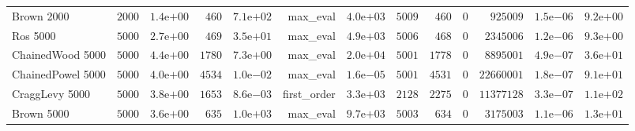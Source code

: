 \begin{longtable}[c]{lrrrrrrrrrrrr}
Brown 2000 & \( 2000\) & \( 1.4\)e\(+00\) & \(  460\) & \( 7.1\)e\(+02\) & max\_eval & \( 4.0\)e\(+03\) & \( 5009\) & \(  460\) & \(    0\) & \(925009\) & \( 1.5\)e\(-06\) & \( 9.2\)e\(+00\) \\
Ros 5000 & \( 5000\) & \( 2.7\)e\(+00\) & \(  469\) & \( 3.5\)e\(+01\) & max\_eval & \( 4.9\)e\(+03\) & \( 5006\) & \(  468\) & \(    0\) & \(2345006\) & \( 1.2\)e\(-06\) & \( 9.3\)e\(+00\) \\
ChainedWood 5000 & \( 5000\) & \( 4.4\)e\(+00\) & \( 1780\) & \( 7.3\)e\(+00\) & max\_eval & \( 2.0\)e\(+04\) & \( 5001\) & \( 1778\) & \(    0\) & \(8895001\) & \( 4.9\)e\(-07\) & \( 3.6\)e\(+01\) \\
ChainedPowel 5000 & \( 5000\) & \( 4.0\)e\(+00\) & \( 4534\) & \( 1.0\)e\(-02\) & max\_eval & \( 1.6\)e\(-05\) & \( 5001\) & \( 4531\) & \(    0\) & \(22660001\) & \( 1.8\)e\(-07\) & \( 9.1\)e\(+01\) \\
CraggLevy 5000 & \( 5000\) & \( 3.8\)e\(+00\) & \( 1653\) & \( 8.6\)e\(-03\) & first\_order & \( 3.3\)e\(+03\) & \( 2128\) & \( 2275\) & \(    0\) & \(11377128\) & \( 3.3\)e\(-07\) & \( 1.1\)e\(+02\) \\
Brown 5000 & \( 5000\) & \( 3.6\)e\(+00\) & \(  635\) & \( 1.0\)e\(+03\) & max\_eval & \( 9.7\)e\(+03\) & \( 5003\) & \(  634\) & \(    0\) & \(3175003\) & \( 1.1\)e\(-06\) & \( 1.3\)e\(+01\) \\
\hline 
\end{longtable}



